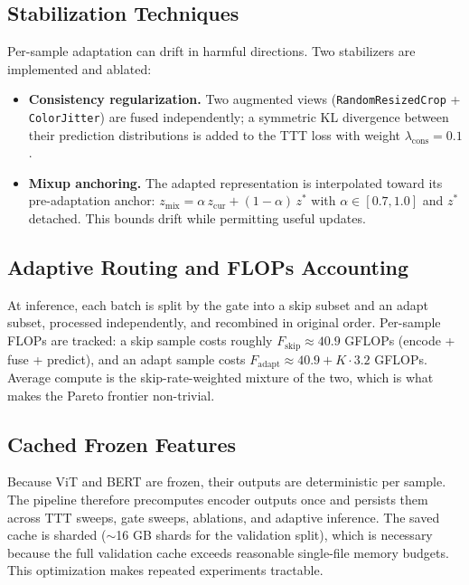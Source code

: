 \documentclass[conference]{IEEEtran}
\begin{document}
\subsection{Stabilization Techniques}

Per-sample adaptation can drift in harmful directions. Two stabilizers
are implemented and ablated:

\begin{itemize}
    \item \textbf{Consistency regularization.} Two augmented views
    (\texttt{RandomResizedCrop} + \texttt{ColorJitter}) are fused
    independently; a symmetric KL divergence between their prediction
    distributions is added to the TTT loss with weight $\lambda_{\mathrm{
    cons}}{=}0.1$.
    \item \textbf{Mixup anchoring.} The adapted representation is
    interpolated toward its pre-adaptation anchor:
    $z_{\mathrm{mix}} = \alpha\,z_{\mathrm{cur}} + (1-\alpha)\,z^*$ with
    $\alpha \in [0.7, 1.0]$ and $z^*$ detached. This bounds drift while
    permitting useful updates.
\end{itemize}

\subsection{Adaptive Routing and FLOPs Accounting}

At inference, each batch is split by the gate into a skip subset and an
adapt subset, processed independently, and recombined in original order.
Per-sample FLOPs are tracked: a skip sample costs roughly
$F_{\mathrm{skip}} \approx 40.9$ GFLOPs (encode + fuse + predict), and
an adapt sample costs $F_{\mathrm{adapt}} \approx 40.9 + K\cdot 3.2$
GFLOPs. Average compute is the skip-rate-weighted mixture of the two,
which is what makes the Pareto frontier non-trivial.

\subsection{Cached Frozen Features}\label{sec:cache}

Because ViT and BERT are frozen, their outputs are deterministic per
sample. The pipeline therefore precomputes encoder outputs once and
persists them across TTT sweeps, gate sweeps, ablations, and adaptive
inference. The saved cache is sharded ($\sim$16 GB shards for the
validation split), which is necessary because the full validation cache
exceeds reasonable single-file memory budgets. This optimization makes
repeated experiments tractable.
\end{document}
